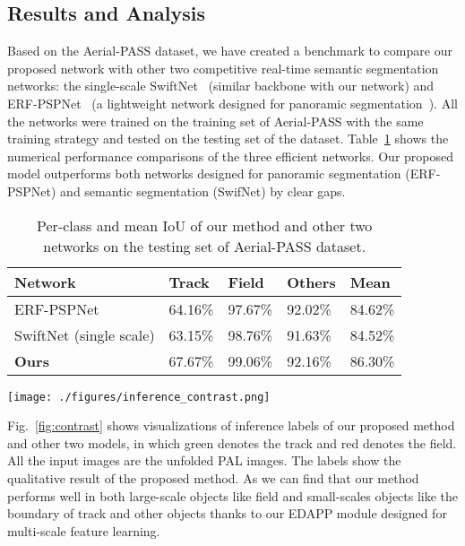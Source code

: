\documentclass[letterpaper, 10 pt, conference]{ieeeconf}
\begin{document}
\subsection{Results and Analysis}

Based on the Aerial-PASS dataset, we have created a benchmark to compare our proposed network with other two competitive real-time semantic segmentation networks: the single-scale SwiftNet~\cite{swiftnet} (similar backbone with our network) and ERF-PSPNet~\cite{erf_pspnet} (a lightweight network designed for panoramic segmentation~\cite{pass}).
All the networks were trained on the training set of Aerial-PASS with the same training strategy and tested on the testing set of the dataset. Table~\ref{pal-accuracy} shows the numerical performance comparisons of the three efficient networks. Our proposed model outperforms both networks designed for panoramic segmentation (ERF-PSPNet) and semantic segmentation (SwifNet) by clear gaps. 

\begin{table}[!t]
\caption{Per-class and mean IoU of our method and other two networks on the testing set of Aerial-PASS dataset.}
\label{pal-accuracy}
\begin{tabular}{l|l|l|l|l}
\textbf{Network}      & \textbf{Track} & \textbf{Field} & \textbf{Others} & \textbf{Mean} \\ \hline
ERF-PSPNet            & 64.16\%        & 97.67\%        & 92.02\%         & 84.62\%       \\ \hline
SwiftNet (single scale) & 63.15\%        & 98.76\%        & 91.63\%         & 84.52\%       \\ \hline
\textbf{Ours}         & 67.67\%        & 99.06\%        & 92.16\%         & 86.30\%      
\end{tabular}
\end{table}

\begin{figure*}
    \centering
    \texttt{[image: ./figures/inference\_contrast.png]}
    \caption{Qualitative semantic segmentation results. From top to bottom row: RGB input image, ERF-PSPNet, SwiftNet, our method, and ground truth.}
    \label{fig:contrast}
\end{figure*}

Fig.~\ref{fig:contrast} shows visualizations of inference labels of our proposed method and other two models, in which green denotes the track and red denotes the field. All the input images are the unfolded PAL images.
The labels show the qualitative result of the proposed method.
As we can find that our method performs well in both large-scale objects like field and small-scales objects like the boundary of track and other objects thanks to our EDAPP module designed for multi-scale feature learning.
\end{document}
